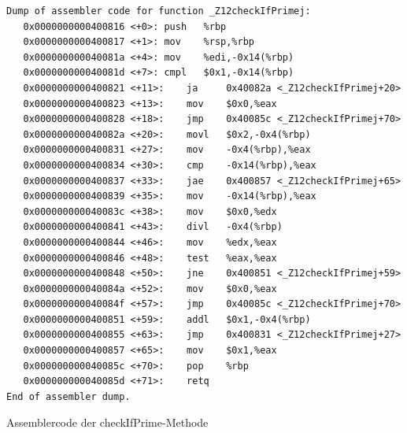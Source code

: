 \documentclass[12pt]{article}
\begin{document}
\begin{code}[!htb]
\begin{lstlisting}
Dump of assembler code for function _Z12checkIfPrimej:
   0x0000000000400816 <+0>:	push   %rbp
   0x0000000000400817 <+1>:	mov    %rsp,%rbp
   0x000000000040081a <+4>:	mov    %edi,-0x14(%rbp)
   0x000000000040081d <+7>:	cmpl   $0x1,-0x14(%rbp)
   0x0000000000400821 <+11>:	ja     0x40082a <_Z12checkIfPrimej+20>
   0x0000000000400823 <+13>:	mov    $0x0,%eax
   0x0000000000400828 <+18>:	jmp    0x40085c <_Z12checkIfPrimej+70>
   0x000000000040082a <+20>:	movl   $0x2,-0x4(%rbp)
   0x0000000000400831 <+27>:	mov    -0x4(%rbp),%eax
   0x0000000000400834 <+30>:	cmp    -0x14(%rbp),%eax
   0x0000000000400837 <+33>:	jae    0x400857 <_Z12checkIfPrimej+65>
   0x0000000000400839 <+35>:	mov    -0x14(%rbp),%eax
   0x000000000040083c <+38>:	mov    $0x0,%edx
   0x0000000000400841 <+43>:	divl   -0x4(%rbp)
   0x0000000000400844 <+46>:	mov    %edx,%eax
   0x0000000000400846 <+48>:	test   %eax,%eax
   0x0000000000400848 <+50>:	jne    0x400851 <_Z12checkIfPrimej+59>
   0x000000000040084a <+52>:	mov    $0x0,%eax
   0x000000000040084f <+57>:	jmp    0x40085c <_Z12checkIfPrimej+70>
   0x0000000000400851 <+59>:	addl   $0x1,-0x4(%rbp)
   0x0000000000400855 <+63>:	jmp    0x400831 <_Z12checkIfPrimej+27>
   0x0000000000400857 <+65>:	mov    $0x1,%eax
   0x000000000040085c <+70>:	pop    %rbp
   0x000000000040085d <+71>:	retq   
End of assembler dump.

\end{lstlisting}
\caption[Assemblercode der checkIfPrime Methode]{Assemblercode der checkIfPrime-Methode}
\end{code}
\end{document}
